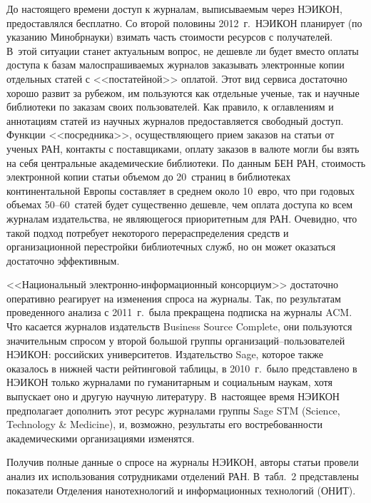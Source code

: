 \begin{multicols}{2}
     До настоящего времени доступ к журналам, выписываемым через 
НЭИКОН, предоставлялся бесплатно. Со второй половины 2012~г.\ 
НЭИКОН планирует (по указанию Минобрнауки) взимать часть стоимости 
ресурсов с получателей. В~этой ситуации станет актуальным вопрос, не 
дешевле ли будет вместо оплаты доступа к базам малоспрашиваемых 
журналов заказывать электронные копии отдельных статей с 
<<постатейной>> оплатой. Этот вид сервиса достаточно хорошо развит за 
рубежом, им пользуются как отдельные ученые, так и научные биб\-лио\-те\-ки 
по заказам своих пользователей. Как правило, к оглавлениям и аннотациям 
статей из научных журналов предоставляется свободный доступ. Функции 
<<посредника>>, осуществляющего прием заказов на статьи от ученых РАН, 
контакты с поставщиками, оплату заказов в валюте могли бы взять на себя 
центральные академические биб\-лио\-те\-ки. По данным БЕН РАН, стоимость 
электронной копии статьи объемом до 20~страниц в биб\-лио\-те\-ках 
континентальной Европы составляет в среднем около 10~евро, что при 
годовых объемах 50--60~статей будет существенно дешевле, чем оплата 
доступа ко всем журналам издательства, не являющегося приоритетным для 
РАН. Очевидно, что такой подход потребует некоторого перераспределения 
средств и организационной перестройки биб\-лио\-теч\-ных служб, но он может 
оказаться достаточно эффективным.
     
     <<Национальный электронно-информационный консорциум>> достаточно оперативно реагирует на изменения 
спроса на журналы. Так, по \mbox{результа\-там} проведенного анализа с 2011~г.\ 
была прекращена подписка на журналы ACM. 
Что касается журналов издательств Business Source Complete, они 
пользуются значительным спросом у второй большой группы 
     ор\-га\-ни\-за\-ций--поль\-зо\-ва\-те\-лей \mbox{НЭИКОН}: российских университетов. 
Издательство Sage, которое также оказалось в нижней части рейтинговой 
таб\-ли\-цы, в 2010~г.\ было пред\-став\-ле\-но в \mbox{НЭИКОН} только журналами по 
гуманитарным и социальным наукам, хотя выпускает оно и другую научную 
литературу. В~настоящее время НЭИКОН предполагает дополнить этот 
ресурс журналами группы Sage STM (Science, Technology \& Medicine), и, 
возможно, результаты его востребованности академическими организациями 
изменятся.
     
     Получив полные данные о спросе на журналы НЭИКОН, авторы статьи 
провели анализ их использования сотрудниками отделений РАН. В~табл.~2 
представлены показатели Отделения нанотехнологий и информационных 
технологий (ОНИТ). 



\end{multicols}

